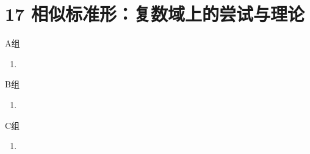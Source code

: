 \section*{17 相似标准形：复数域上的尝试与理论}

\vspace{2ex}

\centerline{\heiti A组}
\begin{enumerate}
    \item
\end{enumerate}

\centerline{\heiti B组}
\begin{enumerate}
    \item
\end{enumerate}

\centerline{\heiti C组}
\begin{enumerate}
    \item
\end{enumerate}

\clearpage
